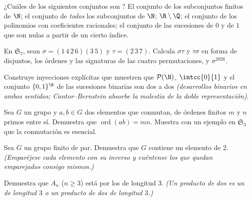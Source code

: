 \begin{exercise}[$\star$]\label{exo:b2:structures:1}
¿Cuáles de los siguientes conjuntos son ? El conjunto de
los subconjuntos finitos de $\N$; el conjunto de \emph{todos} los
subconjuntos de $\N$; $\R \setminus \Q$; el conjunto de los
polinomios con coeficientes racionales; el conjunto de las
sucesiones de $0$ y de $1$ que son nulas a partir de un cierto
índice.
\end{exercise}

\begin{exercise}[$\star$]\label{exo:b2:structures:2}
En $\mathfrak{S}_7$, sean $\sigma = (1\,4\,2\,6)(3\,5)$ y $\tau =
(2\,3\,7)$. Calcula $\sigma\tau$ y $\tau\sigma$ en forma de
 disjuntos, los órdenes y las signaturas de las cuatro
permutaciones, y $\sigma^{2026}$.
\end{exercise}

\begin{exercise}[$\star$]\label{exo:b2:structures:3}
Construye inyecciones explícitas que muestren que $\mathcal{P}(\N)$,
$\intcc{0}{1}$ y el conjunto $\{0,1\}^{\N}$ de las sucesiones
binarias son  dos a dos \emph{(desarrollos binarios en
ambos sentidos; Cantor--Bernstein absorbe la molestia de la doble
representación)}.
\end{exercise}

\begin{exercise}[$\star$]\label{exo:b2:structures:4}
Sea $G$ un grupo y $a, b \in G$ dos elementos que conmutan, de
órdenes finitos $m$ y $n$ primos entre sí. Demuestra que
$\operatorname{ord}(ab) = mn$. Muestra con un ejemplo en
$\mathfrak{S}_3$ que la conmutación es esencial.
\end{exercise}

\begin{exercise}[$\star\star$]\label{exo:b2:structures:5}
Sea $G$ un grupo finito de  par. Demuestra que $G$ contiene un
elemento de  $2$. \emph{(Emparéjese cada elemento con su
inverso y cuéntense los que quedan emparejados consigo mismos.)}
\end{exercise}

\begin{exercise}[$\star\star$]\label{exo:b2:structures:6}
Demuestra que $A_n$ ($n \geq 3$) está  por los  de
longitud $3$. \emph{(Un producto de dos  es un 
de longitud $3$ o un producto de dos  de longitud $3$.)}
\end{exercise}

